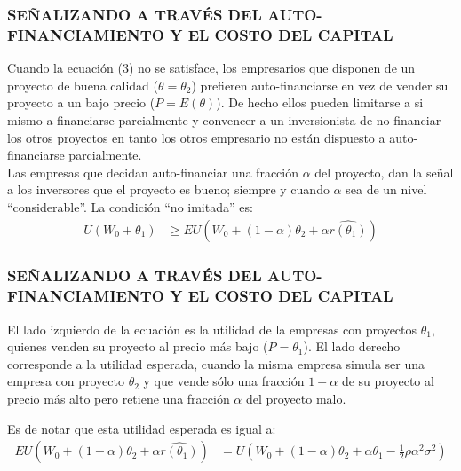 \begin{frame}
    \frametitle{{\normalsize SEÑALIZANDO A TRAVÉS DEL AUTO-FINANCIAMIENTO Y EL COSTO DEL CAPITAL} {}}
    Cuando la ecuación (3) no se satisface, los empresarios que disponen de un proyecto de buena calidad ($\theta=\theta_{2}$) prefieren auto-financiarse en vez de vender su proyecto a un bajo precio ($P=E(\theta)$). De hecho ellos pueden limitarse a si mismo a financiarse parcialmente y convencer a un inversionista de no financiar los otros proyectos en tanto los otros empresario no están dispuesto a auto-financiarse parcialmente.\\
    Las empresas que decidan auto-financiar una fracción $\alpha$ del proyecto, dan la señal a los inversores que el proyecto es bueno; siempre y cuando $\alpha$ sea de un nivel   ``considerable''. La condición  ``no imitada'' es: 
       \begin{align}
      U(W_{0}+\theta_{1})&\geq EU(W_{0}+(1-\alpha)\theta_{2}+\alpha\hat{r(\theta_{1})}) 
      \end{align}  
       
\end{frame}



\begin{frame}
\frametitle{{\normalsize SEÑALIZANDO A TRAVÉS DEL AUTO-FINANCIAMIENTO Y EL COSTO DEL CAPITAL} {}}

El lado izquierdo de la ecuación es la utilidad de la empresas con proyectos $\theta_{1}$, quienes venden su proyecto al precio más bajo ($P=\theta_{1}$). El lado derecho corresponde a la utilidad esperada, cuando la misma empresa simula ser una empresa con proyecto $\theta_{2}$ y que vende sólo una fracción $1-\alpha$ de su proyecto al precio más alto pero retiene una fracción $\alpha$ del proyecto malo.

  Es de notar que esta utilidad esperada es igual a:
\begin{align}
EU(W_{0}+(1-\alpha)\theta_{2}+\alpha\hat{r(\theta_{1})})&= U(W_{0}+(1-\alpha)\theta_{2}+\alpha\theta_{1}-\frac{1}{2}\rho \alpha^{2} \sigma^{2})
\end{align} 

\end{frame}

